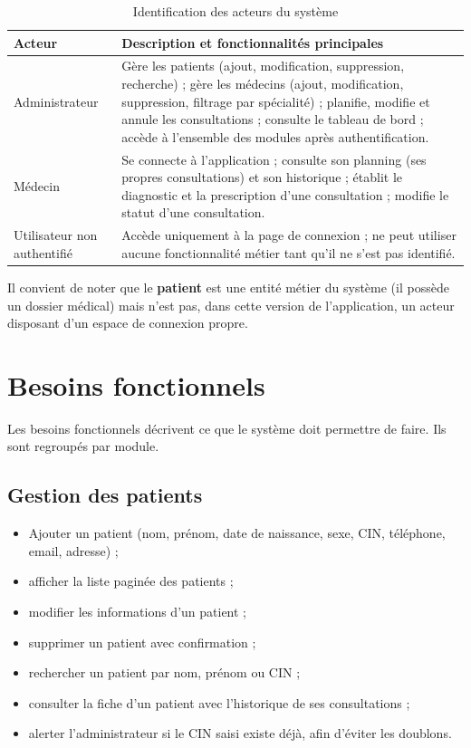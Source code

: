 \begin{table}[H]
\centering
\begin{tabularx}{\textwidth}{l X}
\toprule
\textbf{Acteur} & \textbf{Description et fonctionnalités principales} \\
\midrule
Administrateur &
Gère les patients (ajout, modification, suppression, recherche) ; gère les médecins (ajout, modification, suppression, filtrage par spécialité) ; planifie, modifie et annule les consultations ; consulte le tableau de bord ; accède à l'ensemble des modules après authentification. \\
\addlinespace
Médecin &
Se connecte à l'application ; consulte son planning (ses propres consultations) et son historique ; établit le diagnostic et la prescription d'une consultation ; modifie le statut d'une consultation. \\
\addlinespace
Utilisateur non authentifié &
Accède uniquement à la page de connexion ; ne peut utiliser aucune fonctionnalité métier tant qu'il ne s'est pas identifié. \\
\bottomrule
\end{tabularx}
\caption{Identification des acteurs du système}
\label{tab:acteurs}
\end{table}

Il convient de noter que le \textbf{patient} est une entité métier du système (il possède un dossier médical) mais n'est pas, dans cette version de l'application, un acteur disposant d'un espace de connexion propre.

\section{Besoins fonctionnels}

Les besoins fonctionnels décrivent ce que le système doit permettre de faire. Ils sont regroupés par module.

\subsection{Gestion des patients}

\begin{itemize}
    \item Ajouter un patient (nom, prénom, date de naissance, sexe, CIN, téléphone, email, adresse) ;
    \item afficher la liste paginée des patients ;
    \item modifier les informations d'un patient ;
    \item supprimer un patient avec confirmation ;
    \item rechercher un patient par nom, prénom ou CIN ;
    \item consulter la fiche d'un patient avec l'historique de ses consultations ;
    \item alerter l'administrateur si le CIN saisi existe déjà, afin d'éviter les doublons.
\end{itemize}

